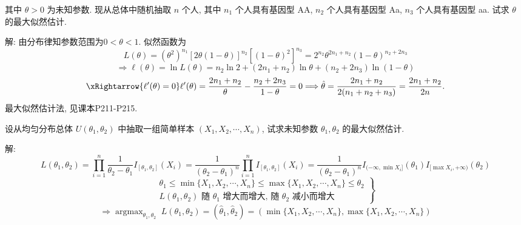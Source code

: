 \documentclass[standard]{ExBook}
\renewenvironment{shaded}{%
  \def\FrameCommand{\fboxsep=\FrameSep \colorbox{shadecolor}}%
  \MakeFramed{\advance\hsize-\width \FrameRestore}%
}{%
  \endMakeFramed
}
\begin{document}
\begin{qitems}
\begin{bbox}
\begin{shaded}
其中 \(\theta > 0\) 为未知参数. 现从总体中随机抽取 \(n\) 个人, 其中 \(n_1\) 个人具有基因型 AA, \(n_2\) 个人具有基因型 Aa, \(n_3\) 个人具有基因型 aa. 试求 \(\theta\) 的最大似然估计.
    \end{shaded}
    \end{bbox}

\vspace{\dimexpr2.5cm-5em\relax}

解: 由分布律知参数范围为$0<\theta<1$. 似然函数为
$$
L(\theta)
=(\theta^2)^{n_1}[2\theta(1-\theta)]^{n_2}[(1-\theta)^2]^{n_3}
=2^{n_2}\theta^{2n_1+n_2}(1-\theta)^{n_2+2n_3}
$$
$$
\Longrightarrow
\ell(\theta)=\ln L(\theta)
=n_2\ln2+(2n_1+n_2)\ln\theta+(n_2+2n_3)\ln(1-\theta)
$$
$$
\xRightarrow{\ell'(\theta)=0}
\ell'(\theta)
=\frac{2n_1+n_2}{\theta}
-\frac{n_2+2n_3}{1-\theta}
=0
\Longrightarrow
\hat{\theta}
=\frac{2n_1+n_2}{2(n_1+n_2+n_3)}
=\frac{2n_1+n_2}{2n}.
$$
\textcolor{themeColor}{\selectfont {} 最大似然估计法, 见课本P211-P215.}

\vspace{2.5cm-5em}

    \begin{bbox}
    \begin{shaded}
        \qitem
设从均匀分布总体 \(U(\theta_1, \theta_2)\) 中抽取一组简单样本 \((X_1, X_2, \cdots, X_n)\), 试求未知参数 \(\theta_1, \theta_2\) 的最大似然估计.
    \end{shaded}
    \end{bbox}

\vspace{\dimexpr2.5cm-5em\relax}

解: 
$$
L(\theta_1, \theta_2) = 
\prod_{i=1}^n \frac{1}{\theta_2 - \theta_1} I_{[\theta_1, \theta_2]}(X_i)
= \frac{1}{(\theta_2 - \theta_1)^n} \prod_{i=1}^n I_{[\theta_1, \theta_2]}(X_i)
= \frac{1}{(\theta_2-\theta_1)^n}I_{(-\infty,\min X_i]}(\theta_1)I_{[\max X_i,+\infty)}(\theta_2)
$$
$$
\left.
\begin{array}{r}
    \theta_1 \leq \min\{X_1, X_2, \cdots, X_n\} \leq \max\{X_1, X_2, \cdots, X_n\} \leq \theta_2\\
    L(\theta_1, \theta_2) \text{ 随 } \theta_1 \text{ 增大而增大, 随 } \theta_2 \text{ 减小而增大}    
\end{array}
\right\}
$$
$$
\Longrightarrow
\mathop{\mathrm{argmax}}_{\theta_1, \theta_2}\;L(\theta_1, \theta_2)
=
(\hat{\theta}_1, \hat{\theta}_2)
=
\left(\min\{X_1, X_2, \cdots, X_n\}, \max\{X_1, X_2, \cdots, X_n\}\right)
$$

\vspace{2.5cm-5em}


\end{qitems}
\end{document}
